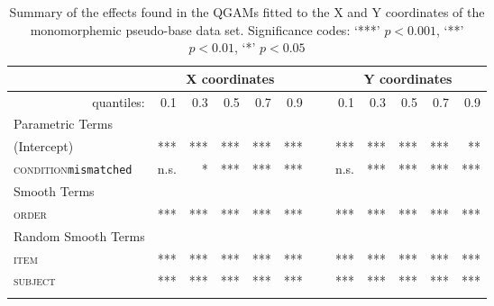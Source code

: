 \begin{table}\fontsize{9}{10}
\caption{Summary of the effects found in the QGAMs fitted to the X and Y coordinates of the monomorphemic pseudo-base data set. Significance codes: `***' $p < 0.001$, `**' $p < 0.01$, `*' $p < 0.05$}
\label{tab:7.11}
\centering
\begin{tabular}{lrrrrrrrrrrr}
\lsptoprule
~                   & \multicolumn{5}{c}{X coordinates}       & \multicolumn{1}{c}{}                       & \multicolumn{5}{c}{Y coordinates}                               \\
\midrule
\multicolumn{1}{r}{quantiles:}          & 0.1        & 0.3        & 0.5        & 0.7        & 0.9 & ~        & 0.1        & 0.3        & 0.5        & 0.7        & 0.9         \\
\midrule
Parametric Terms    & \textbf{~} & \textbf{~} & \textbf{~} & \textbf{~} & \textbf{~} & \textbf{~} & \textbf{~} & \textbf{~} & \textbf{~} & \textbf{~}  \\
\midrule
(Intercept)         & ***        & ***        & ***        & ***        & *** & ~       & ***        & ***        & ***        & ***        & **          \\
\textsc{condition}\texttt{mismatched} & n.s.       & *          & ***        & ***        & ***   & ~     & n.s.       & ***        & ***        & ***        & ***         \\
\midrule
Smooth Terms        & \textbf{~} & \textbf{~} & \textbf{~} & \textbf{~} & \textbf{~} & \textbf{~} & \textbf{~} & \textbf{~} & \textbf{~} & \textbf{~}  \\
\midrule
\textsc{order}               & ***        & ***        & ***        & ***        & ***  & ~      & ***        & ***        & ***        & ***        & ***         \\
\midrule
Random Smooth Terms & \textbf{~} & \textbf{~} & \textbf{~} & \textbf{~} & \textbf{~} & \textbf{~} & \textbf{~} & \textbf{~} & \textbf{~} & \textbf{~}  \\
\midrule
\textsc{item}                & ***        & ***        & ***        & ***        & ***   & ~     & ***        & ***        & ***        & ***        & ***         \\
\textsc{subject}             & ***        & ***        & ***        & ***        & ***   & ~     & ***        & ***        & ***        & ***        & ***        \\
\lspbottomrule
\end{tabular}
\end{table}


